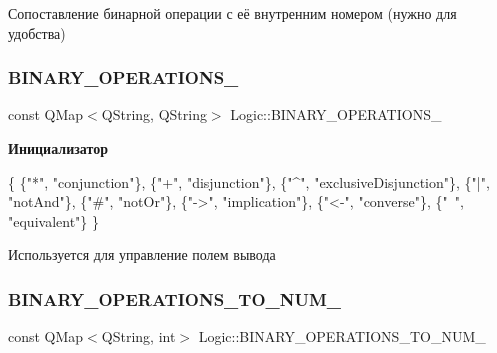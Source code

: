 Сопоставление бинарной операции с её внутренним номером (нужно для удобства) 

\mbox{\label{class_logic_a87779b9da5a43f388cbb26982502e989}} 
\subsubsection{\texorpdfstring{B\+I\+N\+A\+R\+Y\+\_\+\+O\+P\+E\+R\+A\+T\+I\+O\+N\+S\+\_\+}{BINARY\_OPERATIONS\_}}
{\footnotesize\ttfamily const Q\+Map$<$Q\+String, Q\+String$>$ Logic\+::\+B\+I\+N\+A\+R\+Y\+\_\+\+O\+P\+E\+R\+A\+T\+I\+O\+N\+S\+\_\+}

{\bfseries Инициализатор}
\begin{DoxyCode}
\{
        \{\textcolor{stringliteral}{"*"}, \textcolor{stringliteral}{"conjunction"}\},
        \{\textcolor{stringliteral}{"+"}, \textcolor{stringliteral}{"disjunction"}\},
        \{\textcolor{stringliteral}{"^"}, \textcolor{stringliteral}{"exclusiveDisjunction"}\},
        \{\textcolor{stringliteral}{"|"}, \textcolor{stringliteral}{"notAnd"}\},
        \{\textcolor{stringliteral}{"#"}, \textcolor{stringliteral}{"notOr"}\},
        \{\textcolor{stringliteral}{"->"}, \textcolor{stringliteral}{"implication"}\},
        \{\textcolor{stringliteral}{"<-"}, \textcolor{stringliteral}{"converse"}\},
        \{\textcolor{stringliteral}{"~"}, \textcolor{stringliteral}{"equivalent"}\}
    \}
\end{DoxyCode}


Используется для управление полем вывода 

\mbox{\label{class_logic_a80a5ac2ef983887c55d5b64e941b9dbe}} 
\subsubsection{\texorpdfstring{B\+I\+N\+A\+R\+Y\+\_\+\+O\+P\+E\+R\+A\+T\+I\+O\+N\+S\+\_\+\+T\+O\+\_\+\+N\+U\+M\+\_\+}{BINARY\_OPERATIONS\_TO\_NUM\_}}
{\footnotesize\ttfamily const Q\+Map$<$Q\+String, int$>$ Logic\+::\+B\+I\+N\+A\+R\+Y\+\_\+\+O\+P\+E\+R\+A\+T\+I\+O\+N\+S\+\_\+\+T\+O\+\_\+\+N\+U\+M\+\_\+}

